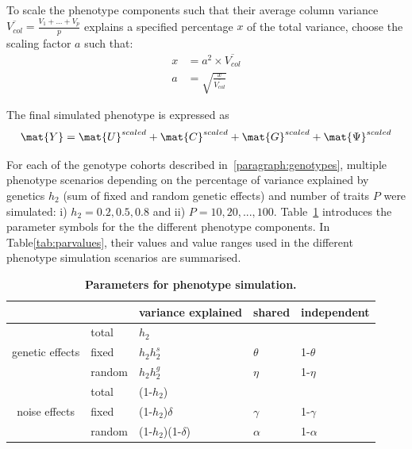 To scale the phenotype components such that their average column variance \(\overline{V_{col}} = \frac{V_1 + ... + V_p}{p} \) explains a specified  percentage \(x\) of the total variance, choose the scaling factor \(a\) such that: 
\begin{equation}
\begin{aligned}
x  &= a^2 \times \overline{V_{col}} \\
a  &= \sqrt{\frac{x}{\overline{V_{col}}}}
\end{aligned}
\end{equation}

The final simulated phenotype is expressed as
\begin{equation}
\mat{Y} = \mat{U}^{scaled}   + \mat{C}^{scaled} +  \mat{G}^{scaled} +  \mat{\Psi}^{scaled} 
\end{equation}

For each of the genotype cohorts described in~\ref{paragraph:genotypes}, multiple phenotype scenarios depending on the percentage of variance explained by genetics \(h_2\) (sum of fixed and random genetic effects) and number of traits \(P\) were simulated: i) \(h_2={0.2, 0.5, 0.8}\) and ii) \(P={10, 20, ..., 100}\). Table~\ref{tab:pardescription} introduces the parameter symbols for the the different phenotype components. In Table\ref{tab:parvalues}, their values and value ranges used in the different phenotype simulation scenarios are summarised. 


\begin{table}[htbp]
   \caption{\textbf{Parameters for phenotype simulation.}}
  \centering
    \begin{tabular}{cllrr}
    \toprule
          &       & variance explained & \multicolumn{1}{l}{shared} & \multicolumn{1}{l}{independent} \\
    \midrule
    \multirow{3}[0]{*}{genetic effects} & total & \(h_2\) &       &  \\
          & fixed & \(h_2h_2^s\) & \multicolumn{1}{l}{\(\theta\)} & \multicolumn{1}{l}{1-\(\theta\)} \\
          & random & \(h_2h_2^g\) & \multicolumn{1}{l}{\(\eta\)} & \multicolumn{1}{l}{1-\(\eta\)} \\[0.5cm]

    \multirow{3}[0]{*}{noise effects} & total & (1-\(h_2\)) &       &  \\
    		& fixed & (1-\(h_2\))\(\delta\) & \multicolumn{1}{l}{\(\gamma\)} & \multicolumn{1}{l}{1-\(\gamma\)} \\
          & random & (1-\(h_2\))(1-\(\delta\)) & \multicolumn{1}{l}{\(\alpha\)} & \multicolumn{1}{l}{1-\(\alpha\)} \\
           \bottomrule
    \end{tabular}%

  \label{tab:pardescription}%
\end{table}%


